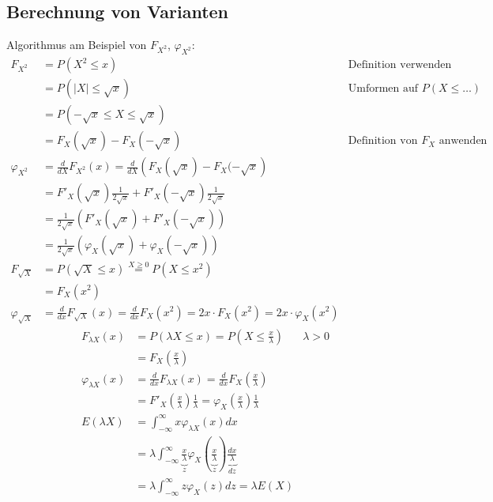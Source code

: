 \documentclass[10pt,a4paper]{scrartcl}
\begin{document}
\subsection{Berechnung von Varianten} %
Algorithmus am Beispiel von $F_{X^2}$, $\varphi_{X^2}$:
\begin{align*}
F_{X^2} & = P(X^2 \le x) & \text{Definition verwenden}\\
        & = P(|X| \le \sqrt{x}) & \text{Umformen auf } P(X \le \dots) \\
        & = P(-\sqrt{x} \le X \le \sqrt{x}) \\
        & = F_X(\sqrt{x}) - F_X(-\sqrt{x}) & \text{Definition von } F_X\text{ anwenden} \\
\varphi_{X^2} & = \frac{d}{dX} F_{X^2}(x) = \frac{d}{dX}\left(F_X(\sqrt{x}) - F_X(-\sqrt{x}\right) \\
        & = F'_X(\sqrt{x}) \frac{1}{2\sqrt{x}} + F'_X(-\sqrt{x}) \frac{1}{2\sqrt{x}} \\
        & = \frac{1}{2\sqrt{x}} \left( F'_X(\sqrt{x}) + F'_X(-\sqrt{x})\right) \\
        & = \frac{1}{2\sqrt{x}} \left(\varphi_X(\sqrt{x}) + \varphi_X(-\sqrt{x})\right) \\[1cm]
F_{\sqrt{X}} & = P(\sqrt{X} \le x) \stackrel{X\ge0}{=} P(X \le x^2) \\
             & = F_X(x^2) \\
\varphi_{\sqrt{X}} & = \frac{d}{dx} F_{\sqrt{X}}(x) = \frac{d}{dx} F_X(x^2) = 2x \cdot F_X(x^2) = 2x\cdot\varphi_X(x^2)
\end{align*}
\begin{align*}
F_{\lambda X}(x) & = P(\lambda X \le x) = P\left(X \le \frac{x}{\lambda}\right) & \lambda > 0 \\
                 & = F_X\left(\frac{x}{\lambda}\right) \\
\varphi_{\lambda X}(x) & = \frac{d}{dx}F_{\lambda X}(x) = \frac{d}{dx}F_{X}\left(\frac{x}{\lambda}\right) \\
                       & = F'_X\left(\frac{x}{\lambda}\right) \frac{1}{\lambda} = \varphi_X\left(\frac{x}{\lambda}\right)\frac{1}{\lambda} \\
E(\lambda X) & = \int_{-\infty}^\infty x\varphi_{\lambda X} (x)dx \\
             & = \lambda\int_{-\infty}^\infty \underbrace{\frac{x}{\lambda}}_z \varphi_X(\underbrace{\frac{x}{\lambda}}_z) \underbrace{\frac{dx}{\lambda}}_{dz} \\
             & = \lambda \int_{-\infty}^\infty z\varphi_X(z) dz = \lambda E(X)
\end{align*}
\end{document}
